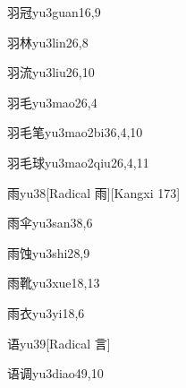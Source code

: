 \begin{entry}{羽冠}{yu3guan1}{6,9}
\end{entry}

\begin{entry}{羽林}{yu3lin2}{6,8}
\end{entry}

\begin{entry}{羽流}{yu3liu2}{6,10}
\end{entry}

\begin{entry}{羽毛}{yu3mao2}{6,4}
\end{entry}

\begin{entry}{羽毛笔}{yu3mao2bi3}{6,4,10}
\end{entry}

\begin{entry}{羽毛球}{yu3mao2qiu2}{6,4,11}
\end{entry}

\begin{entry}{雨}{yu3}{8}[Radical 雨][Kangxi 173]
\end{entry}

\begin{entry}{雨伞}{yu3san3}{8,6}
\end{entry}

\begin{entry}{雨蚀}{yu3shi2}{8,9}
\end{entry}

\begin{entry}{雨靴}{yu3xue1}{8,13}
\end{entry}

\begin{entry}{雨衣}{yu3yi1}{8,6}
\end{entry}

\begin{entry}{语}{yu3}{9}[Radical 言]
\end{entry}

\begin{entry}{语调}{yu3diao4}{9,10}
\end{entry}

